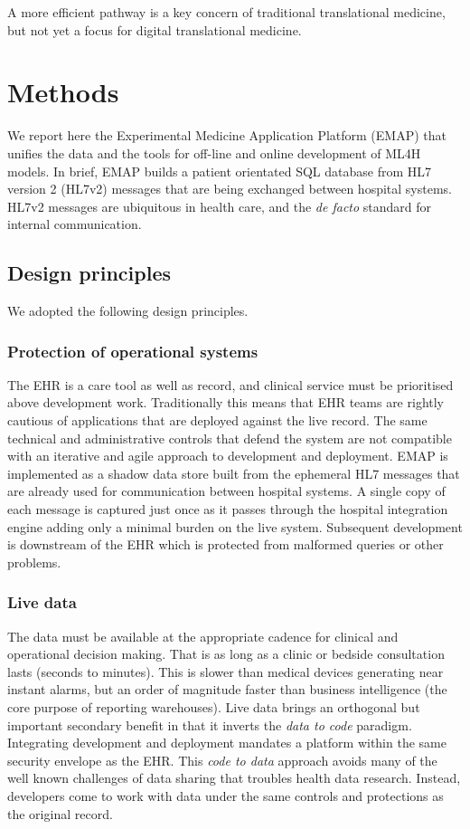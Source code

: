 \documentclass[pmlr,twocolumn,10pt]{jmlr} %
\begin{document}
A more efficient pathway is a key concern of traditional translational medicine\citep{woolf2008}, but not yet a focus for digital translational medicine.

\section{Methods}
We report here the Experimental Medicine Application Platform (EMAP) that unifies the data and the tools for off-line and online development of ML4H models. In brief, EMAP builds a patient orientated SQL database from HL7 version 2 (HL7v2) messages that are being exchanged between hospital systems. HL7v2 messages are ubiquitous in health care, and the \textit{de facto} standard for internal communication.

\subsection{Design principles}
We adopted the following design principles.

\subsubsection{Protection of operational systems}
The EHR is a care tool as well as record, and clinical service must be prioritised above development work. Traditionally this means that EHR teams are rightly cautious of applications that are deployed against the live record. The same technical and administrative controls that defend the system are not compatible with an iterative and agile approach to development and deployment.
EMAP is implemented as a shadow data store built from the ephemeral HL7 messages that are already used for communication between hospital systems. A single copy of each message is captured just once as it passes through the hospital integration engine adding only a minimal burden on the live system. Subsequent development is downstream of the EHR which is protected from malformed queries or other problems.

\subsubsection{Live data}
The data must be available at the appropriate cadence for clinical and operational decision making. That is as long as a clinic or bedside consultation lasts (seconds to minutes). This is slower than medical devices generating near instant alarms, but an order of magnitude faster than business intelligence (the core purpose of reporting warehouses).
Live data brings an orthogonal but important secondary benefit in that it inverts the \textit{data to code} paradigm.\citep{guinney2018} Integrating development and deployment mandates a platform within the same security envelope as the EHR. This \textit{code to data} approach avoids many of the well known challenges of data sharing that troubles health data research.\citep{powles2017} Instead, developers come to work with data under the same controls and protections as the original record.
\end{document}
